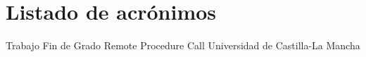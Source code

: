 \chapter{Listado de acrónimos}

\begin{acronym}[XXXXXXXX]
       {Trabajo Fin de Grado}
       {Remote Procedure Call}
      {Universidad de Castilla-La Mancha}
\end{acronym}




